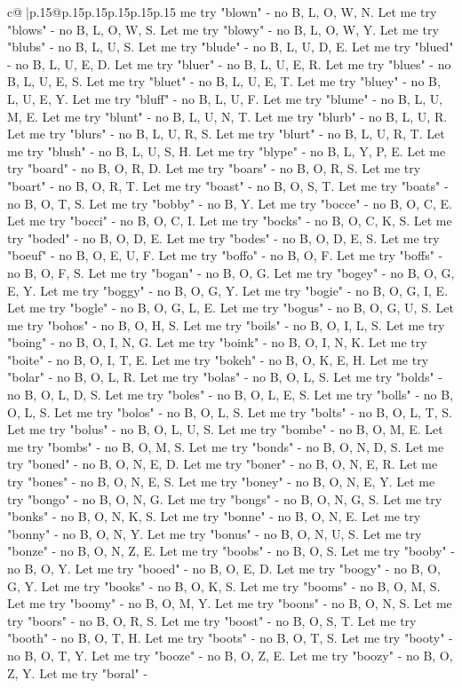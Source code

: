 \documentclass{article}
\begin{document}
{\begin{supertabular}{c@{$\;$}|p{.15\linewidth}@{}p{.15\linewidth}p{.15\linewidth}p{.15\linewidth}p{.15\linewidth}p{.15\linewidth}}
{{{me try "blown" {-} no B, L, O, W, N. Let me try "blows" {-} no B, L, O, W, S. Let me try "blowy" {-} no B, L, O, W, Y. Let me try "blubs" {-} no B, L, U, S. Let me try "blude" {-} no B, L, U, D, E. Let me try "blued" {-} no B, L, U, E, D. Let me try "bluer" {-} no B, L, U, E, R. Let me try "blues" {-} no B, L, U, E, S. Let me try "bluet" {-} no B, L, U, E, T. Let me try "bluey" {-} no B, L, U, E, Y. Let me try "bluff" {-} no B, L, U, F. Let me try "blume" {-} no B, L, U, M, E. Let me try "blunt" {-} no B, L, U, N, T. Let me try "blurb" {-} no B, L, U, R. Let me try "blurs" {-} no B, L, U, R, S. Let me try "blurt" {-} no B, L, U, R, T. Let me try "blush" {-} no B, L, U, S, H. Let me try "blype" {-} no B, L, Y, P, E. Let me try "board" {-} no B, O, R, D. Let me try "boars" {-} no B, O, R, S. Let me try "boart" {-} no B, O, R, T. Let me try "boast" {-} no B, O, S, T. Let me try "boats" {-} no B, O, T, S. Let me try "bobby" {-} no B, Y. Let me try "bocce" {-} no B, O, C, E. Let me try "bocci" {-} no B, O, C, I. Let me try "bocks" {-} no B, O, C, K, S. Let me try "boded" {-} no B, O, D, E. Let me try "bodes" {-} no B, O, D, E, S. Let me try "boeuf" {-} no B, O, E, U, F. Let me try "boffo" {-} no B, O, F. Let me try "boffs" {-} no B, O, F, S. Let me try "bogan" {-} no B, O, G. Let me try "bogey" {-} no B, O, G, E, Y. Let me try "boggy" {-} no B, O, G, Y. Let me try "bogie" {-} no B, O, G, I, E. Let me try "bogle" {-} no B, O, G, L, E. Let me try "bogus" {-} no B, O, G, U, S. Let me try "bohos" {-} no B, O, H, S. Let me try "boils" {-} no B, O, I, L, S. Let me try "boing" {-} no B, O, I, N, G. Let me try "boink" {-} no B, O, I, N, K. Let me try "boite" {-} no B, O, I, T, E. Let me try "bokeh" {-} no B, O, K, E, H. Let me try "bolar" {-} no B, O, L, R. Let me try "bolas" {-} no B, O, L, S. Let me try "bolds" {-} no B, O, L, D, S. Let me try "boles" {-} no B, O, L, E, S. Let me try "bolls" {-} no B, O, L, S. Let me try "bolos" {-} no B, O, L, S. Let me try "bolts" {-} no B, O, L, T, S. Let me try "bolus" {-} no B, O, L, U, S. Let me try "bombe" {-} no B, O, M, E. Let me try "bombs" {-} no B, O, M, S. Let me try "bonds" {-} no B, O, N, D, S. Let me try "boned" {-} no B, O, N, E, D. Let me try "boner" {-} no B, O, N, E, R. Let me try "bones" {-} no B, O, N, E, S. Let me try "boney" {-} no B, O, N, E, Y. Let me try "bongo" {-} no B, O, N, G. Let me try "bongs" {-} no B, O, N, G, S. Let me try "bonks" {-} no B, O, N, K, S. Let me try "bonne" {-} no B, O, N, E. Let me try "bonny" {-} no B, O, N, Y. Let me try "bonus" {-} no B, O, N, U, S. Let me try "bonze" {-} no B, O, N, Z, E. Let me try "boobs" {-} no B, O, S. Let me try "booby" {-} no B, O, Y. Let me try "booed" {-} no B, O, E, D. Let me try "boogy" {-} no B, O, G, Y. Let me try "books" {-} no B, O, K, S. Let me try "booms" {-} no B, O, M, S. Let me try "boomy" {-} no B, O, M, Y. Let me try "boons" {-} no B, O, N, S. Let me try "boors" {-} no B, O, R, S. Let me try "boost" {-} no B, O, S, T. Let me try "booth" {-} no B, O, T, H. Let me try "boots" {-} no B, O, T, S. Let me try "booty" {-} no B, O, T, Y. Let me try "booze" {-} no B, O, Z, E. Let me try "boozy" {-} no B, O, Z, Y. Let me try "boral" {-} }}}
\end{supertabular}}
\end{document}
